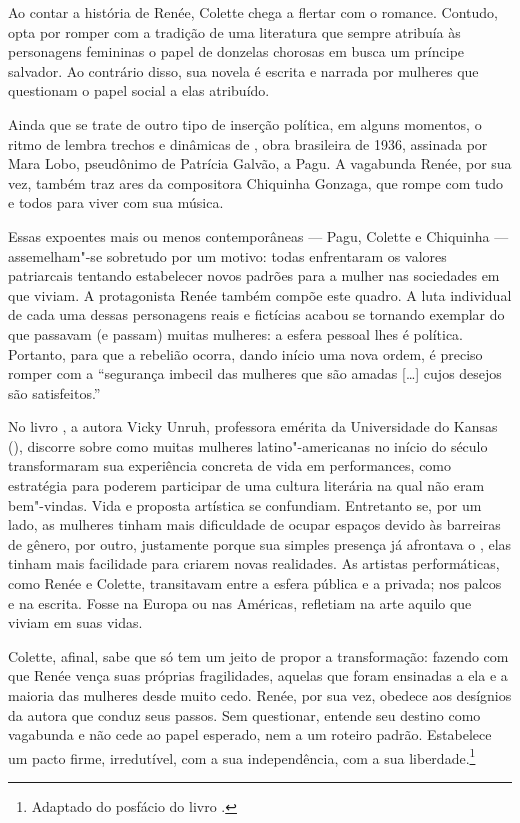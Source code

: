 \begin{multicols}{2}
Ao contar a história de Renée, Colette chega a flertar com o romance. Contudo, opta por romper com a tradição de uma literatura que sempre atribuía às personagens femininas o papel de donzelas chorosas em busca um príncipe salvador. Ao contrário disso, sua novela é escrita e narrada por mulheres que questionam o papel social a elas atribuído.

Ainda que se trate de outro tipo de inserção política, em alguns momentos, o ritmo de {} lembra trechos e dinâmicas de {}, obra brasileira de 1936, assinada por Mara Lobo, pseudônimo de Patrícia Galvão, a Pagu. A vagabunda Renée, por sua vez, também traz ares da compositora Chiquinha Gonzaga, que rompe com tudo e todos para viver com sua música.

Essas expoentes mais ou menos contemporâneas --- Pagu, Colette e Chiquinha --- assemelham"-se sobretudo por um motivo: todas enfrentaram os valores patriarcais tentando estabelecer novos padrões para a mulher nas sociedades em que viviam. A protagonista Renée também compõe este quadro. A luta individual de cada uma dessas personagens reais e fictícias acabou se tornando exemplar do que passavam (e passam) muitas mulheres: a esfera pessoal lhes é política. Portanto, para que a rebelião ocorra, dando início uma nova ordem, é preciso romper com a “segurança imbecil das mulheres que são amadas [\ldots{}] cujos desejos são satisfeitos.”

No livro {}, a autora Vicky Unruh, professora emérita da Universidade do Kansas (), discorre sobre como muitas mulheres latino"-americanas no início do século  transformaram sua experiência concreta de vida em performances, como estratégia para poderem participar de uma cultura literária na qual não eram bem"-vindas. Vida e proposta artística se confundiam. Entretanto se, por um lado, as mulheres tinham mais dificuldade de ocupar espaços devido às barreiras de gênero, por outro, justamente porque sua simples presença já afrontava o {}, elas tinham mais facilidade para criarem novas realidades. As artistas performáticas, como Renée e Colette, transitavam entre a esfera pública e a privada; nos palcos e na escrita. Fosse na Europa ou nas Américas, refletiam na arte aquilo que viviam em suas vidas.

Colette, afinal, sabe que só tem um jeito de propor a transformação: fazendo com que Renée vença suas próprias fragilidades, aquelas que foram ensinadas a ela e a maioria das mulheres desde muito cedo. Renée, por sua vez, obedece aos desígnios da autora que conduz seus passos. Sem questionar, entende seu destino como vagabunda e não cede ao papel esperado, nem a um roteiro padrão. Estabelece um pacto firme, irredutível, com a sua independência, com a sua liberdade.\footnote[1]{Adaptado do posfácio do livro {}.}
\end{multicols}


